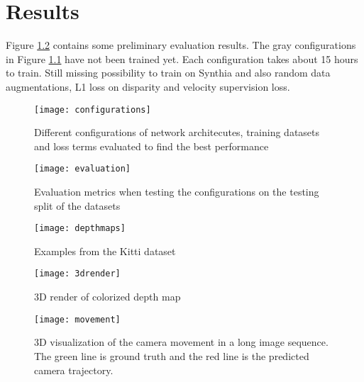 \chapter{Results}\label{cha:results}

Figure \ref{fig:evaluation} contains some preliminary evaluation results. The gray configurations in Figure \ref{fig:configurations} have not been trained yet. Each configuration takes about 15 hours to train. Still missing possibility to train on Synthia and also random data augmentations, L1 loss on disparity and velocity supervision loss.

\begin{figure}[H]
	\centering
	\texttt{[image: configurations]}
	\caption{Different configurations of network architecutes, training datasets and loss terms evaluated to find the best performance}
	\label{fig:configurations}
\end{figure}

\begin{figure}[H]
	\centering
	\texttt{[image: evaluation]}
	\caption{Evaluation metrics when testing the configurations on the testing split of the datasets}
	\label{fig:evaluation}
\end{figure}

\clearpage

\begin{figure}[H]
	\centering
	\texttt{[image: depthmaps]}
	\caption{Examples from the Kitti dataset}
	\label{fig:depthmapskitty}
\end{figure}


\begin{figure}[H]
	\centering
	\texttt{[image: 3drender]}
	\caption{3D render of colorized depth map}
	\label{fig:3drender}
\end{figure}

\begin{figure}[H]
	\centering
	\texttt{[image: movement]}
	\caption{3D visualization of the camera movement in a long image sequence. The green line is ground truth and the red line is the predicted camera trajectory.}
	\label{fig:movement}
\end{figure}